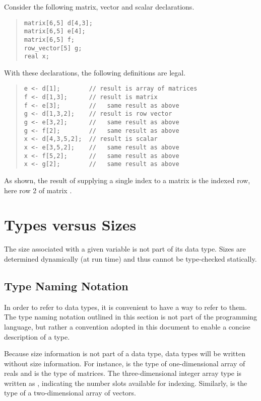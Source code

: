 Consider the following matrix, vector and scalar declarations.
%
\begin{quote}
\begin{Verbatim}[fontsize=\small]
matrix[6,5] d[4,3];
matrix[6,5] e[4];
matrix[6,5] f;
row_vector[5] g;
real x;
\end{Verbatim}
\end{quote}
%
With these declarations, the following definitions are legal.
%
\begin{quote}
\begin{Verbatim}[fontsize=\small]
e <- d[1];        // result is array of matrices
f <- d[1,3];      // result is matrix
f <- e[3];        //   same result as above
g <- d[1,3,2];    // result is row vector
g <- e[3,2];      //   same result as above
g <- f[2];        //   same result as above
x <- d[4,3,5,2];  // result is scalar
x <- e[3,5,2];    //   same result as above
x <- f[5,2];      //   same result as above
x <- g[2];        //   same result as above
\end{Verbatim}
\end{quote}
%
As shown, the result  of supplying a single index to a
matrix is the indexed row, here row 2 of matrix .


\section{Types versus Sizes}

The size associated with a given variable is not part of its data
type.  Sizes are determined dynamically (at run time) and thus
cannot be type-checked statically.  

\subsection{Type Naming Notation}

In order to refer to data types, it is convenient to have a way to
refer to them.  The type naming notation outlined in this section is
not part of the \Stan programming language, but rather a convention
adopted in this document to enable a concise description of a type.

Because size information is not part of a data type, data
types will be written without size information.  For instance,
 is the type of one-dimensional array of reals and
 is the type of matrices.  The three-dimensional integer
array type is written as , indicating the number slots
available for indexing.  Similarly,  is the type of a
two-dimensional array of vectors.



